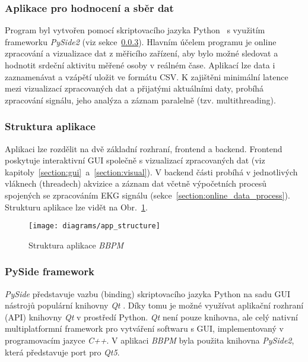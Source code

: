 \subsubsection{Aplikace pro hodnocení a sběr dat}
Program byl vytvořen pomocí skriptovacího jazyka
Python~\cite{python} s využitím frameworku \textit{PySide2} (viz
sekce~\ref{section:pyside}). Hlavním účelem programu je online zpracování a
vizualizace dat z měřicího zařízení, aby bylo možné sledovat a hodnotit
srdeční aktivitu měřené osoby v reálném čase. Aplikací lze data i
zaznamenávat a vzápětí uložit ve formátu CSV. K zajištěni minimální latence mezi
vizualizací zpracovaných dat a přijatými aktuálními daty, probíhá zpracování
signálu, jeho analýza a záznam paralelně (tzv. multithreading).

\subsubsection{Struktura aplikace}
Aplikaci lze rozdělit na dvě základní rozhraní, frontend a backend. Frontend
poskytuje interaktivní GUI společně s vizualizací zpracovaných dat (viz
kapitoly~\ref{section:gui}~a~\ref{section:visual}). V backend části probíhá v
jednotlivých vláknech (threadech) akvizice a záznam dat včetně výpočetních
procesů spojených se zpracováním EKG signálu (sekce~\ref{section:online_data_process}). 
Strukturu aplikace lze vidět na Obr.~\ref{fig:app_structure}.

\begin{figure}[h]
    \begin{center}
        \texttt{[image: diagrams/app\_structure]}
        \caption{Struktura aplikace \textit{BBPM}}
        \label{fig:app_structure}
    \end{center}
\end{figure}

\subsubsection{PySide framework}
\label{section:pyside}
\textit{PySide} představuje vazbu (binding) skriptovacího jazyka Python
na sadu GUI nástrojů populární knihovny \textit{Qt} \cite{Qt}. Díky tomu je
možné využívat aplikační rozhraní (API) knihovny \textit{Qt} v prostředí
Python. \textit{Qt} není pouze knihovna, ale celý nativní
multiplatformní framework pro vytváření softwaru s GUI, implementovaný v programovacím
jazyce \textit{C++}. V aplikaci \textit{BBPM} byla použita knihovna
\textit{PySide2}, která představuje port pro \textit{Qt5}.

